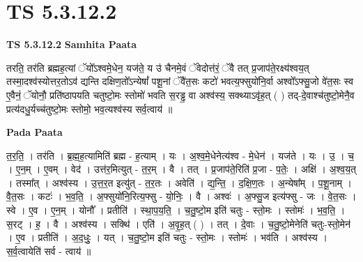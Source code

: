 \documentclass[17pt]{extarticle}
\begin{document}
\section*{ TS 5.3.12.2 }

\textbf{TS 5.3.12.2 } \newline
\textbf{Samhita Paata} \newline

तरति॒ तर॑ति ब्रह्मह॒त्यां ॅयो᳚ऽश्वमे॒धेन॒ यज॑ते॒ य उ॑ चैनमे॒वं ॅवेदोत्त॑रं॒ ॅवै तत् प्र॒जाप॑ते॒रक्ष्य॑श्वय॒त् तस्मा॒दश्व॑स्योत्तर॒तोऽव॑ द्यन्ति दक्षिण॒तो᳚ऽन्येषां᳚ पशू॒नां ॅवै॑त॒सः कटो॑ भवत्य॒फ्सुयो॑नि॒र्वा अश्वो᳚ऽफ्सु॒जो वे॑त॒सः स्व ए॒वैनं॒ ॅयोनौ॒ प्रति॑ष्ठापयति चतुष्टो॒मः स्तोमो॑ भवति स॒रड्ढ॒ वा अश्व॑स्य॒ सक्थ्याऽवृ॑ह॒त् ( ) तद्-दे॒वाश्च॑तुष्टो॒मेनै॒व प्रत्य॑दधु॒र्यच्च॑तुष्टो॒मः स्तोमो॒ भव॒त्यश्व॑स्य सर्व॒त्वाय॑ ॥ \newline

\textbf{Pada Paata} \newline

त॒र॒ति॒ । तर॑ति । ब्र॒ह्म॒ह॒त्यामिति॑ ब्रह्म - ह॒त्याम् । यः । अ॒श्व॒मे॒धेनेत्य॑श्व - मे॒धेन॑ । यज॑ते । यः । उ॒ । च॒ । ए॒न॒म् । ए॒वम् । वेद॑ । उत्त॑र॒मित्युत् - त॒र॒म् । वै । तत् । प्र॒जाप॑ते॒रिति॑ प्र॒जा - प॒तेः॒ । अक्षि॑ । अ॒श्व॒य॒त् । तस्मा᳚त् । अश्व॑स्य । उ॒त्त॒र॒त इत्यु॑त् - त॒र॒तः । अवेति॑ । द्य॒न्ति॒ । द॒क्षि॒ण॒तः । अ॒न्येषा᳚म् । प॒शू॒नाम् । वै॒त॒सः । कटः॑ । भ॒व॒ति॒ । अ॒फ्सुयो॑नि॒रित्य॒फ्सु - यो॒निः॒ । वै । अश्वः॑ । अ॒फ्सु॒ज इत्य॑फ्सु - जः । वे॒त॒सः । स्वे । ए॒व । ए॒न॒म् । योनौ᳚ । प्रतीति॑ । स्था॒प॒य॒ति॒ । च॒तु॒ष्टो॒म इति॑ चतुः - स्तो॒मः । स्तोमः॑ । भ॒व॒ति॒ । स॒रट् । ह॒ । वै । अश्व॑स्य । सक्थि॑ । एति॑ । अ॒वृ॒ह॒त् ( ) । तत् । दे॒वाः । च॒तु॒ष्टो॒मेनेति॑ चतुः-स्तो॒मेन॑ । ए॒व । प्रतीति॑ । अ॒द॒धुः॒ । यत् । च॒तु॒ष्टो॒म इति॑ चतुः - स्तो॒मः । स्तोमः॑ । भव॑ति । अश्व॑स्य । स॒र्व॒त्वायेति॑ सर्व - त्वाय॑ ॥  \newline
\end{document}
